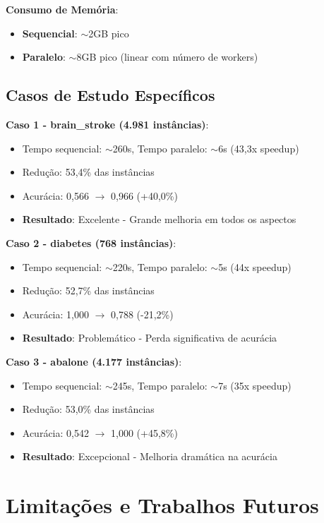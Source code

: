 \documentclass[12pt,a4paper]{article}
\begin{document}
\textbf{Consumo de Memória}:
\begin{itemize}
    \item \textbf{Sequencial}: $\sim$2GB pico
    \item \textbf{Paralelo}: $\sim$8GB pico (linear com número de workers)
\end{itemize}

\subsection{Casos de Estudo Específicos}

\textbf{Caso 1 - brain\_stroke (4.981 instâncias)}:
\begin{itemize}
    \item Tempo sequencial: $\sim$260s, Tempo paralelo: $\sim$6s (43,3x speedup)
    \item Redução: 53,4\% das instâncias
    \item Acurácia: 0,566 $\rightarrow$ 0,966 (+40,0\%)
    \item \textbf{Resultado}: Excelente - Grande melhoria em todos os aspectos
\end{itemize}

\textbf{Caso 2 - diabetes (768 instâncias)}:
\begin{itemize}
    \item Tempo sequencial: $\sim$220s, Tempo paralelo: $\sim$5s (44x speedup)
    \item Redução: 52,7\% das instâncias
    \item Acurácia: 1,000 $\rightarrow$ 0,788 (-21,2\%)
    \item \textbf{Resultado}: Problemático - Perda significativa de acurácia
\end{itemize}

\textbf{Caso 3 - abalone (4.177 instâncias)}:
\begin{itemize}
    \item Tempo sequencial: $\sim$245s, Tempo paralelo: $\sim$7s (35x speedup)
    \item Redução: 53,0\% das instâncias
    \item Acurácia: 0,542 $\rightarrow$ 1,000 (+45,8\%)
    \item \textbf{Resultado}: Excepcional - Melhoria dramática na acurácia
\end{itemize}

\section{Limitações e Trabalhos Futuros}
\end{document}
